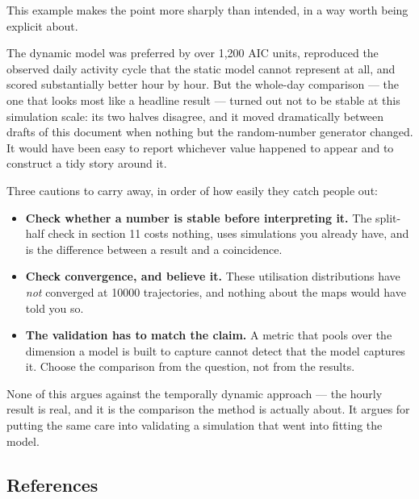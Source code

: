 \documentclass[
  letterpaper,
  DIV=11,
  numbers=noendperiod]{scrartcl}
\providecommand{\tightlist}{%
  \setlength{\itemsep}{0pt}\setlength{\parskip}{0pt}}
\begin{document}
This example makes the point more sharply than intended, in a way worth
being explicit about.

The dynamic model was preferred by over 1,200 AIC units, reproduced the
observed daily activity cycle that the static model cannot represent at
all, and scored substantially better hour by hour. But the whole-day
comparison --- the one that looks most like a headline result --- turned
out not to be stable at this simulation scale: its two halves disagree,
and it moved dramatically between drafts of this document when nothing
but the random-number generator changed. It would have been easy to
report whichever value happened to appear and to construct a tidy story
around it.

Three cautions to carry away, in order of how easily they catch people
out:

\begin{itemize}
\tightlist
\item
  \textbf{Check whether a number is stable before interpreting it.} The
  split-half check in section 11 costs nothing, uses simulations you
  already have, and is the difference between a result and a
  coincidence.
\item
  \textbf{Check convergence, and believe it.} These utilisation
  distributions have \emph{not} converged at 10000 trajectories, and
  nothing about the maps would have told you so.
\item
  \textbf{The validation has to match the claim.} A metric that pools
  over the dimension a model is built to capture cannot detect that the
  model captures it. Choose the comparison from the question, not from
  the results.
\end{itemize}

None of this argues against the temporally dynamic approach --- the
hourly result is real, and it is the comparison the method is actually
about. It argues for putting the same care into validating a simulation
that went into fitting the model.

\subsection{References}\label{references}
\end{document}
